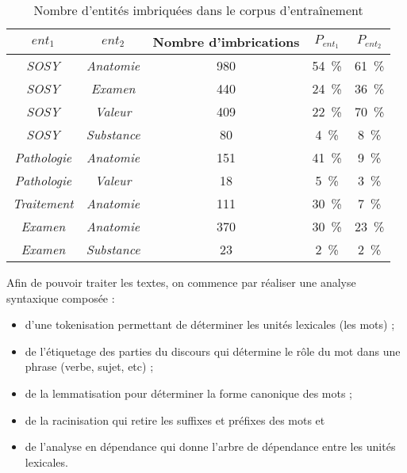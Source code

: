 \begin{table}[htb]
    \centering
    \begin{tabular}{c|c|c|c|c}
        $ent_1$           & $ent_2$          & Nombre d'imbrications & $P_{ent_1}$       & $P_{ent_2}$       \\
        \hline
        \hline
        \emph{SOSY}       & \emph{Anatomie}  & \num{980}             & \SI{54}{\percent} & \SI{61}{\percent} \\
        \emph{SOSY}       & \emph{Examen}    & \num{440}             & \SI{24}{\percent} & \SI{36}{\percent} \\
        \emph{SOSY}       & \emph{Valeur}    & \num{409}             & \SI{22}{\percent} & \SI{70}{\percent} \\
        \emph{SOSY}       & \emph{Substance} & \num{ 80}             & \SI{4}{\percent}  & \SI{ 8}{\percent} \\
        \emph{Pathologie} & \emph{Anatomie}  & \num{151}             & \SI{41}{\percent} & \SI{ 9}{\percent} \\
        \emph{Pathologie} & \emph{Valeur}    & \num{ 18}             & \SI{5}{\percent}  & \SI{ 3}{\percent} \\
        \emph{Traitement} & \emph{Anatomie}  & \num{111}             & \SI{30}{\percent} & \SI{ 7}{\percent} \\
        \emph{Examen}     & \emph{Anatomie}  & \num{370}             & \SI{30}{\percent} & \SI{23}{\percent} \\
        \emph{Examen}     & \emph{Substance} & \num{ 23}             & \SI{2}{\percent}  & \SI{ 2}{\percent}
    \end{tabular}
    \caption{Nombre d'entités imbriquées dans le corpus d'entraînement}
    \label{tab:tal:imb}
\end{table}

Afin de pouvoir traiter les textes, on commence par réaliser une analyse syntaxique composée :
\begin{itemize}
    \item d'une tokenisation permettant de déterminer les unités lexicales (les mots) ;
    \item de l'étiquetage des parties du discours qui détermine le rôle du mot dans une phrase (verbe, sujet, etc) ;
    \item de la lemmatisation pour déterminer la forme canonique des mots ;
    \item de la racinisation qui retire les suffixes et préfixes des mots et
    \item de l'analyse en dépendance qui donne l'arbre de dépendance entre les unités lexicales.
\end{itemize}

